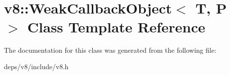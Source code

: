 \hypertarget{classv8_1_1_weak_callback_object}{}\section{v8\+:\+:Weak\+Callback\+Object$<$ T, P $>$ Class Template Reference}
\label{classv8_1_1_weak_callback_object}


The documentation for this class was generated from the following file\+:\begin{DoxyCompactItemize}
\item 
deps/v8/include/v8.\+h\end{DoxyCompactItemize}

